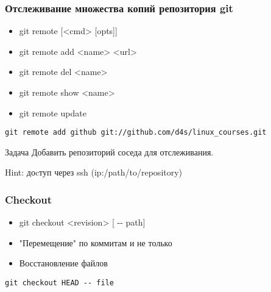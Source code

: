 \begin{frame}[fragile]
	\frametitle{Отслеживание множества копий репозитория git}
	\begin{itemize}
		\item git remote [<cmd> [opts]]
	\end{itemize}

	\begin{itemize}
		\item git remote add <name> <url>
		\item git remote del <name>
		\item git remote show <name>
		\item git remote update
	\end{itemize}

	\begin{verbatim}
git remote add github git://github.com/d4s/linux_courses.git 
	\end{verbatim}

	\begin{block}{Задача}
		Добавить репозиторий соседа для отслеживания.

		Hint: доcтуп через ssh (ip:/path/to/repository)
	\end{block}

\end{frame}


\begin{frame}[fragile]
	\frametitle{Checkout}

	\begin{itemize}
		\item git checkout <revision> [ -{}- path]
	\end{itemize}

	\begin{itemize}
		\item "Перемещение" по коммитам и не только
		\item Восстановление файлов
	\end{itemize}

	\begin{verbatim}
git checkout HEAD -- file
	\end{verbatim}

\end{frame}

